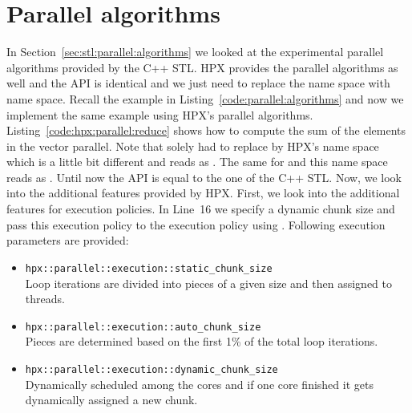 \section{Parallel algorithms}
In Section~\ref{sec:stl:parallel:algorithms} we looked at the experimental parallel algorithms provided by the C++ STL. HPX provides the parallel algorithms as well and the API is identical and we just need to replace the  name space with  name space. Recall the example in Listing~\ref{code:parallel:algorithms} and now we implement the same example using HPX's parallel algorithms. Listing~\ref{code:hpx:parallel:reduce} shows how to compute the sum of the elements in the vector  parallel. Note that solely had to replace  by HPX's name space which is a little bit different and reads as . The same for  and this name space reads as . Until now the API is equal to the one of the C++ STL. Now, we look into the additional features provided by HPX. First, we look into the additional features for execution policies. In Line~16 we specify a dynamic chunk size  and pass this execution policy to the execution policy using . Following execution parameters are provided:
\vspace{0.25cm}
\begin{itemize}
\item \lstinline|hpx::parallel::execution::static_chunk_size| \\
Loop iterations are divided into pieces of a given size and then assigned to threads.
\item \lstinline|hpx::parallel::execution::auto_chunk_size| \\
Pieces are determined based on the first 1\% of the total loop iterations. 
\item \lstinline|hpx::parallel::execution::dynamic_chunk_size| \\
Dynamically scheduled among the cores and if one core finished it gets dynamically assigned a new chunk.
\end{itemize}

